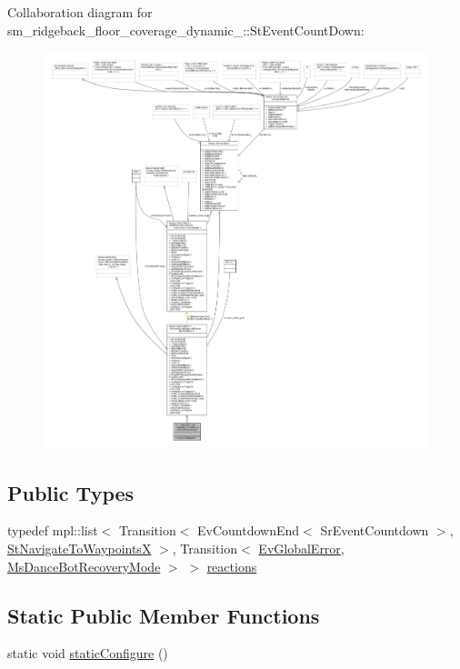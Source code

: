 Collaboration diagram for sm\+\_\+ridgeback\+\_\+floor\+\_\+coverage\+\_\+dynamic\+\_\+:\+:St\+Event\+Count\+Down\+:
\nopagebreak
\begin{figure}[H]
\begin{center}
\leavevmode
\includegraphics[width=350pt]{structsm__ridgeback__floor__coverage__dynamic__1_1_1StEventCountDown__coll__graph}
\end{center}
\end{figure}
\subsection*{Public Types}
\begin{DoxyCompactItemize}
\item 
typedef mpl\+::list$<$ Transition$<$ Ev\+Countdown\+End$<$ Sr\+Event\+Countdown $>$, \hyperlink{structsm__ridgeback__floor__coverage__dynamic__1_1_1StNavigateToWaypointsX}{St\+Navigate\+To\+WaypointsX} $>$, Transition$<$ \hyperlink{structsm__ridgeback__floor__coverage__dynamic__1_1_1EvGlobalError}{Ev\+Global\+Error}, \hyperlink{classsm__ridgeback__floor__coverage__dynamic__1_1_1MsDanceBotRecoveryMode}{Ms\+Dance\+Bot\+Recovery\+Mode} $>$ $>$ \hyperlink{structsm__ridgeback__floor__coverage__dynamic__1_1_1StEventCountDown_afe82e1a76bd4a327fbbfcbff20224557}{reactions}
\end{DoxyCompactItemize}
\subsection*{Static Public Member Functions}
\begin{DoxyCompactItemize}
\item 
static void \hyperlink{structsm__ridgeback__floor__coverage__dynamic__1_1_1StEventCountDown_aacf7e164a0dfb240918ff737fd61570d}{static\+Configure} ()
\end{DoxyCompactItemize}
